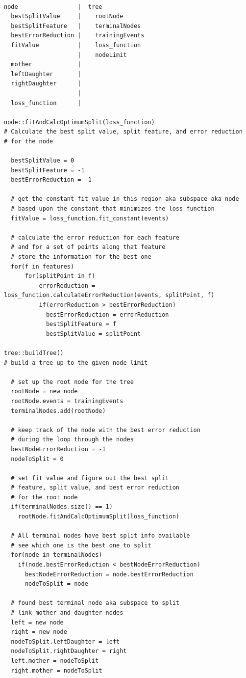 \documentclass[12pt]{article}
\begin{document}
\begin{verbatim}

node                 |  tree
  bestSplitValue     |    rootNode
  bestSplitFeature   |    terminalNodes
  bestErrorReduction |    trainingEvents
  fitValue           |    loss_function
                     |    nodeLimit
  mother             |    
  leftDaughter       |
  rightDaughter      |
                     |
  loss_function      |

node::fitAndCalcOptimumSplit(loss_function)
# Calculate the best split value, split feature, and error reduction
# for the node

  bestSplitValue = 0
  bestSplitFeature = -1
  bestErrorReduction = -1

  # get the constant fit value in this region aka subspace aka node
  # based upon the constant that minimizes the loss function
  fitValue = loss_function.fit_constant(events)

  # calculate the error reduction for each feature
  # and for a set of points along that feature
  # store the information for the best one
  for(f in features)
      for(splitPoint in f)
          errorReduction = loss_function.calculateErrorReduction(events, splitPoint, f)
          if(errorReduction > bestErrorReduction)
            bestErrorReduction = errorReduction
            bestSplitFeature = f
            bestSplitValue = splitPoint

tree::buildTree()
# build a tree up to the given node limit

  # set up the root node for the tree
  rootNode = new node
  rootNode.events = trainingEvents
  terminalNodes.add(rootNode)

  # keep track of the node with the best error reduction
  # during the loop through the nodes
  bestNodeErrorReduction = -1
  nodeToSplit = 0

  # set fit value and figure out the best split
  # feature, split value, and best error reduction
  # for the root node
  if(terminalNodes.size() == 1)
    rootNode.fitAndCalcOptimumSplit(loss_function)

  # All terminal nodes have best split info available
  # see which one is the best one to split
  for(node in terminalNodes)
    if(node.bestErrorReduction < bestNodeErrorReduction)
      bestNodeErrorReduction = node.bestErrorReduction
      nodeToSplit = node

  # found best terminal node aka subspace to split
  # link mother and daughter nodes
  left = new node
  right = new node
  nodeToSplit.leftDaughter = left
  nodeToSplit.rightDaughter = right
  left.mother = nodeToSplit
  right.mother = nodeToSplit


\end{verbatim}
\end{document}

